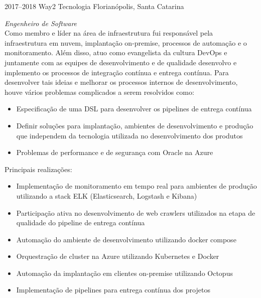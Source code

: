 \documentclass[]{friggeri-cv} %
\begin{document}
\begin{entrylist}
\entry
{2017--2018}
{Way2 Tecnologia}
{Florianópolis, Santa Catarina}
{\emph{Engenheiro de Software} \\

    Como membro e líder na área de infraestrutura fui responsável pela infraestrutura em nuvem, implantação on-premise,
    processos de automação e o monitoramento. Além disso, atuo como evangelista da cultura DevOps e juntamente com as equipes de desenvolvimento e
    de qualidade desenvolvo e implemento os processos de integração contínua e entrega contínua. Para desenvolver tais ideias e melhorar os processos
    internos de desenvolvimento, houve vários problemas complicados a serem resolvidos como:

\begin{itemize}
    \item Especificação de uma DSL para desenvolver os pipelines de entrega contínua
    \item Definir soluções para implantação, ambientes de desenvolvimento e produção que independem da tecnologia utilizada no desenvolvimento dos produtos
    \item Problemas de performance e de segurança com Oracle na Azure
\end{itemize}

Principais realizações:\\

\begin{itemize}
    \item Implementação de monitoramento em tempo real para ambientes de produção utilizando a stack ELK (Elasticsearch, Logstash e Kibana)
    \item Participação ativa no desenvolvimento de web crawlers utilizados na etapa de qualidade do pipeline de entrega contínua
    \item Automação do ambiente de desenvolvimento utilizando docker compose
    \item Orquestração de cluster na Azure utilizando Kubernetes e Docker
    \item Automação da implantação em clientes on-premise utilizando Octopus
    \item Implementação de pipelines para entrega contínua dos projetos
\end{itemize}

}
\end{entrylist}
\end{document}
